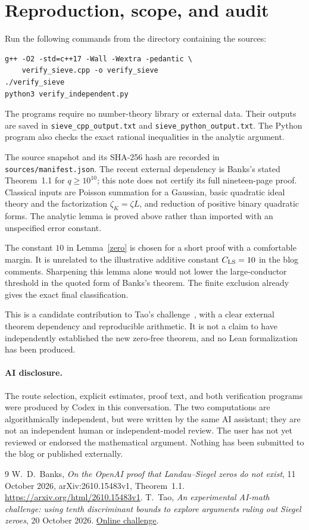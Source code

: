 \documentclass[11pt]{article}
\newcommand{\zK}{\zeta_K}
\begin{document}
\section{Reproduction, scope, and audit}

Run the following commands from the directory containing the sources:
\begin{verbatim}
g++ -O2 -std=c++17 -Wall -Wextra -pedantic \
    verify_sieve.cpp -o verify_sieve
./verify_sieve
python3 verify_independent.py
\end{verbatim}
The programs require no number-theory library or external data.
Their outputs are saved in \texttt{sieve\_cpp\_output.txt} and
\texttt{sieve\_python\_output.txt}.
The Python program also checks the exact rational inequalities in
the analytic argument.

The source snapshot and its SHA-256 hash are recorded in
\texttt{sources/manifest.json}. The recent external dependency is
Banks's stated Theorem~1.1 for \(q\ge10^{10}\); this note
does not certify its full nineteen-page proof.
Classical inputs are Poisson summation for a Gaussian,
basic quadratic ideal theory and the factorization
\(\zK=\zeta L\), and reduction of positive binary quadratic forms.
The analytic lemma is proved above rather than imported with an
unspecified error constant.

The constant \(10\) in Lemma~\ref{zero} is chosen for a short proof
with a comfortable margin. It is unrelated to the illustrative
additive constant \(C_{\rm LS}=10\) in the blog comments.
Sharpening this lemma alone would not lower the large-conductor
threshold in the quoted form of Banks's theorem.
The finite exclusion already gives the exact final classification.

This is a candidate contribution to Tao's challenge~\cite{tao},
with a clear external theorem dependency and reproducible arithmetic.
It is not a claim to have independently established the new
zero-free theorem, and no Lean formalization has been produced.

\paragraph{AI disclosure.}
The route selection, explicit estimates, proof text, and both verification
programs were produced by Codex in this conversation.
The two computations are algorithmically independent, but were written
by the same AI assistant; they are not an independent human or
independent-model review.
The user has not yet reviewed or endorsed the mathematical argument.
Nothing has been submitted to the blog or published externally.

\begin{thebibliography}{9}
W.~D.~Banks,
\emph{On the OpenAI proof that Landau--Siegel zeros do not exist},
11 October 2026, arXiv:2610.15483v1, Theorem~1.1.
\url{https://arxiv.org/html/2610.15483v1}.
T.~Tao,
\emph{An experimental AI-math challenge: using tenth discriminant
bounds to explore arguments ruling out Siegel zeroes},
20 October 2026.
\href{https://terrytao.wordpress.com/2026/10/20/an-experimental-ai-math-challenge-using-tenth-discriminant-bounds-to-explore-arguments-ruling-out-siegel-zeroes/}
{Online challenge}.
\end{thebibliography}
\end{document}
